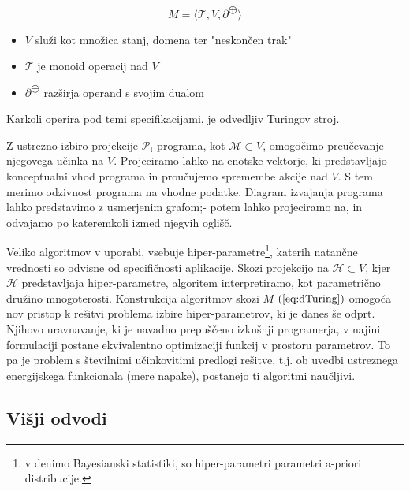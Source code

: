 \documentclass{article}
\newcommand{\II}{\mathbb{I}}
\newcommand{\T}{\mathcal{T}}
\begin{document}
  \begin{equation}\label{eq:dTuring}
  M=\langle\T, V, \partial^{\bigoplus}\rangle
  \end{equation}

 \begin{itemize}
 \item
 $V$ služi kot množica stanj, domena ter "neskončen trak"
 \item
 $\T$ je monoid operacij nad $V$
 \item
 $\partial^{\bigoplus}$ razširja operand s svojim dualom 
 \end{itemize}
 
 Karkoli operira pod temi specifikacijami, je odvedljiv Turingov stroj.
 
 Z ustrezno izbiro projekcije $\mathcal{P}_\II$ programa, kot $\mathcal{M}\subset V$, omogočimo preučevanje njegovega učinka na $V$. Projeciramo lahko na enotske vektorje, ki predstavljajo konceptualni vhod programa in proučujemo spremembe akcije nad $V$. S tem merimo odzivnost programa na vhodne podatke. Diagram izvajanja programa lahko predstavimo z usmerjenim grafom;- potem lahko projeciramo na, in odvajamo po kateremkoli izmed njegvih oglišč.
 
  Veliko algoritmov v uporabi, vsebuje hiper-parametre\footnote[2]{v denimo Bayesianski statistiki, so hiper-parametri parametri a-priori distribucije.}, katerih natančne vrednosti so odvisne od specifičnosti aplikacije. Skozi projekcijo na $\mathcal{H}\subset V$, kjer $\mathcal{H}$ predstavljaja hiper-parametre, algoritem interpretiramo, kot parametrično družino mnogoterosti. Konstrukcija algoritmov skozi $M$ $(\ref{eq:dTuring})$ omogoča nov pristop k rešitvi problema izbire hiper-parametrov, ki je danes še odprt. Njihovo uravnavanje, ki je navadno prepuščeno izkušnji programerja, v najini formulaciji postane ekvivalentno optimizaciji funkcij v prostoru parametrov. To pa je problem s številnimi učinkovitimi predlogi rešitve, t.j. ob uvedbi ustreznega energijskega funkcionala (mere napake), postanejo ti algoritmi naučljivi.
 
 \subsection{Višji odvodi}
 
\end{document}
